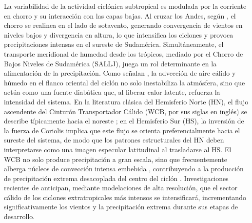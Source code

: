 La variabilidad de la actividad ciclónica subtropical es modulada por la corriente en chorro y su interacción con las capas bajas. Al cruzar los Andes, según \citet{vera2002cold}, el chorro se realinea en el lado de sotavento, generando convergencia de vientos en niveles bajos y divergencia en altura, lo que intensifica los ciclones y provoca precipitaciones intensas en el sureste de Sudamérica. Simultáneamente, el transporte meridional de humedad desde los trópicos, mediado por el Chorro de Bajos Niveles de Sudamérica (SALLJ), juega un rol determinante en la alimentación de la precipitación. Como señalan \citet{reboita2022from}, la advección de aire cálido y húmedo en el flanco oriental del ciclón no solo inestabiliza la atmósfera, sino que actúa como una fuente diabática que, al liberar calor latente, refuerza la intensidad del sistema.
En la literatura clásica del Hemisferio Norte (HN), el flujo ascendente del Cinturón Transportador Cálido (WCB, por sus siglas en inglés) se describe típicamente hacia el noreste \citep{blanchard2021warm}; en el Hemisferio Sur (HS), la inversión de la fuerza de Coriolis implica que este flujo se orienta preferencialmente hacia el sureste del sistema, de modo que los patrones estructurales del HN deben interpretarse como una imagen especular latitudinal al trasladarse al HS.
El WCB no solo produce precipitación a gran escala, sino que frecuentemente alberga núcleos de convección intensa embebida \citep{oertel2021warm}, contribuyendo a la producción de precipitación extrema desacoplada del centro del ciclón \citep{naud2020evaluation}. Investigaciones recientes de \citet{gentile2025response} anticipan, mediante modelaciones de alta resolución, que el sector cálido de los ciclones extratropicales más intensos se intensificará, incrementando significativamente los vientos y la precipitación extrema durante sus etapas de desarrollo.


